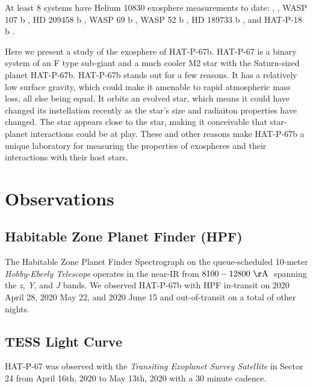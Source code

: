 \documentclass[twocolumn]{aastex631}
\begin{document}
At least 8 systems have Helium 10830 exosphere measurements to date:  \citep{2020ApJ...894...97N, 2021A&A...647A.129L},  \citep{2022AJ....163...68Z}, WASP 107 b \citep{2019A&A...623A..58A,2020AJ....159..115K}, HD 209458 b \citep{2019A&A...629A.110A}, WASP 69 b \citep{2020AJ....159..278V}, WASP 52 b \citep{2020AJ....159..278V}, HD 189733 b \citep{2021A&A...647A.129L}, and HAT-P-18 b \citep{2021ApJ...909L..10P}.


Here we present a study of the exosphere of HAT-P-67b.  HAT-P-67 is a binary system of an F type sub-giant and a much cooler M2 star with the Saturn-sized planet HAT-P-67b.  HAT-P-67b stands out for a few reasons.  It has a relatively low surface gravity, which could make it amenable to rapid atmospheric mass loss, all else being equal.  It orbits an evolved star, which means it could have changed its instellation recently as the star's size and radiaiton properties have changed.  The star appears close to the star, making it conceivable that star-planet interactions could be at play.  These and other reasons make HAT-P-67b a unique laboratory for measuring the properties of exospheres and their interactions with their host stars.

\section{Observations}
\subsection{Habitable Zone Planet Finder (HPF)}

The Habitable Zone Planet Finder Spectrograph \citep[HPF][]{2012SPIE.8446E..1SM,2014SPIE.9147E..1GM, 2019Optic...6..233M} on the queue-scheduled 10-meter \emph{Hobby-Eberly Telescope} \citep[HET][]{1998SPIE.3352...34R, 2007PASP..119..556S} operates in the near-IR from $8100-12800~\mathrm{\AA}\;$ spanning the \textit{z}, \textit{Y}, and \textit{J} bands. We observed HAT-P-67b with HPF in-transit on 2020 April 28, 2020 May 22, and 2020 June 15 and out-of-transit on a total of  other nights.




\subsection{TESS Light Curve}
HAT-P-67 was observed with the \emph{Transiting Exoplanet Survey Satellite} \citep[TESS][]{2014SPIE.9143E..20R} in Sector 24 from April 16th, 2020 to May 13th, 2020 with a 30 minute cadence.
\end{document}
